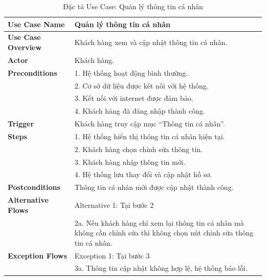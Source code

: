 {\begin{longtable}{|>{\bfseries}p{4cm}|p{11.5cm}|}
\caption{Đặc tả Use Case: Quản lý thông tin cá nhân}
\label{tab:uc-profile-management} \\
\hline
\textbf{Use Case Name} & Quản lý thông tin cá nhân \\
\hline
\textbf{Use Case Overview} & Khách hàng xem và cập nhật thông tin cá nhân. \\
\hline
\textbf{Actor} & Khách hàng. \\
\hline
\textbf{Preconditions} & 1. Hệ thống hoạt động bình thường. \\
& 2. Cơ sở dữ liệu được kết nối với hệ thống. \\
& 3. Kết nối với internet được đảm bảo. \\
& 4. Khách hàng đã đăng nhập thành công. \\
\hline
\textbf{Trigger} & Khách hàng truy cập mục “Thông tin cá nhân”. \\
\hline
\textbf{Steps} & 1. Hệ thống hiển thị thông tin cá nhân hiện tại. \\
& 2. Khách hàng chọn chỉnh sửa thông tin. \\
& 3. Khách hàng nhập thông tin mới. \\
& 4. Hệ thống lưu thay đổi và cập nhật hồ sơ. \\
\hline
\textbf{Postconditions} & Thông tin cá nhân mới được cập nhật thành công. \\
\hline
\textbf{Alternative Flows} & Alternative 1: Tại bước 2 \\
& 2a. Nếu khách hàng chỉ xem lại thông tin cá nhân mà không cần chỉnh sửa thì không chọn nút chỉnh sửa thông tin cá nhân. \\
\hline
\textbf{Exception Flows} & Exception 1: Tại bước 3 \\
& 3a. Thông tin cập nhật không hợp lệ, hệ thống báo lỗi. \\
\hline
\end{longtable}

}
